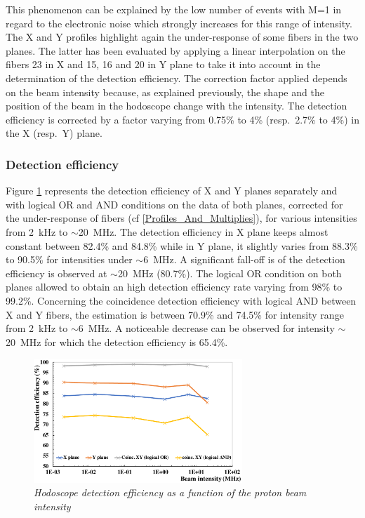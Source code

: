 \documentclass[a4paper,11pt]{article}
\begin{document}
This phenomenon can be explained by the low number of events with M=1 in regard to the electronic noise which strongly increases for this range of intensity. The X and Y profiles highlight again the under-response of some fibers in the two planes. The latter has been evaluated by applying a linear interpolation on the fibers 23 in X and 15, 16 and 20 in Y plane to take it into account in the determination of the detection efficiency. The correction factor applied depends on the beam intensity because, as explained previously, the shape and the position of the beam in the hodoscope change with the intensity. The detection efficiency is corrected by a factor varying from 0.75\% to 4\% (resp.~2.7\% to 4\%) in the X (resp.~Y) plane.


\subsubsection{Detection efficiency}

Figure \ref{fig:DE} represents the detection efficiency of X and Y planes separately and with logical OR and AND conditions on the data of both planes, corrected for the under-response of fibers (cf \ref{Profiles_And_Multiplies}), for various intensities from 2~kHz to $\sim$20~MHz.
The detection efficiency in X plane keeps almost constant between 82.4\% and 84.8\% while in Y plane, it slightly varies from 88.3\% to 90.5\% for intensities under $\sim$6~MHz. A significant fall-off is of the detection efficiency is observed at $\sim$20~MHz (80.7\%). The logical OR condition on both planes allowed to obtain an high detection efficiency rate varying from 98\% to 99.2\%.
Concerning the coincidence detection efficiency with logical AND between X and Y fibers, the estimation is between 70.9\% and 74.5\% for intensity range from 2~kHz to $\sim$6~MHz. A noticeable decrease can be observed for intensity $\sim$20~MHz for which the detection efficiency is 65.4\%.

\begin{figure}[htb]
\centering
\includegraphics[width=0.7\textwidth]{figures/DE_March_2019_corr.pdf}
\caption{\small{\textit{Hodoscope  detection  efficiency  as  a  function  of  the proton beam intensity}}}
\label{fig:DE}
\end{figure}
\end{document}
